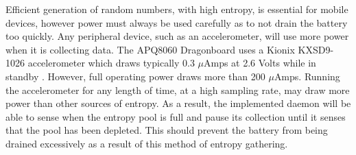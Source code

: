 
Efficient generation of random numbers, with high entropy, is essential for
mobile devices, however power must always be used carefully as to not drain the
battery too quickly. Any peripheral device, such as an accelerometer, will use
more power when it is collecting data. The APQ8060 Dragonboard uses a Kionix
KXSD9-1026 accelerometer which draws typically 0.3 $\mu$Amps at 2.6 Volts while
in standby \cite{Kionix}. However, full operating power draws more than 200
$\mu$Amps. Running the accelerometer for any length of time, at a high sampling
rate, may draw more power than other sources of entropy. As a result, the
implemented daemon will be able to sense when the entropy pool is full and pause
its collection until it senses that the pool has been depleted. This should
prevent the battery from being drained excessively as a result of this method of
entropy gathering.
